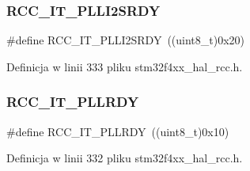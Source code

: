 \subsubsection{\texorpdfstring{R\+C\+C\+\_\+\+I\+T\+\_\+\+P\+L\+L\+I2\+S\+R\+DY}{RCC\_IT\_PLLI2SRDY}}
{\footnotesize\ttfamily \#define R\+C\+C\+\_\+\+I\+T\+\_\+\+P\+L\+L\+I2\+S\+R\+DY~((uint8\+\_\+t)0x20)}



Definicja w linii 333 pliku stm32f4xx\+\_\+hal\+\_\+rcc.\+h.

\mbox{\label{group___r_c_c___interrupt_ga68d48e7811fb58f2649dce6cf0d823d9}} 
\subsubsection{\texorpdfstring{R\+C\+C\+\_\+\+I\+T\+\_\+\+P\+L\+L\+R\+DY}{RCC\_IT\_PLLRDY}}
{\footnotesize\ttfamily \#define R\+C\+C\+\_\+\+I\+T\+\_\+\+P\+L\+L\+R\+DY~((uint8\+\_\+t)0x10)}



Definicja w linii 332 pliku stm32f4xx\+\_\+hal\+\_\+rcc.\+h.

